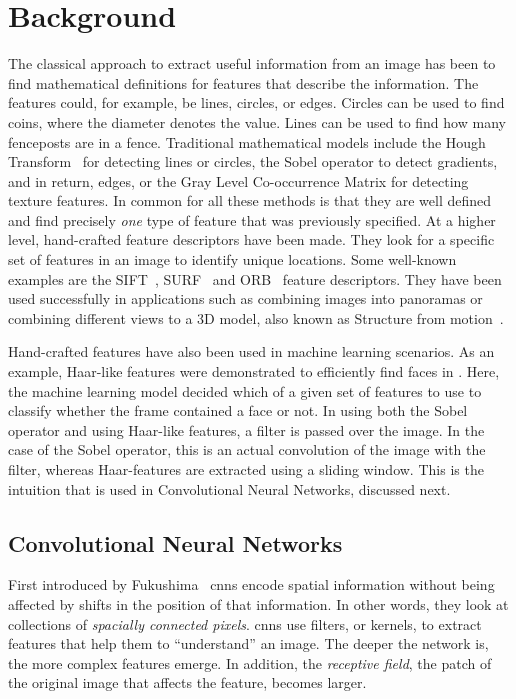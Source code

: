 \chapter{Background}

The classical approach to extract useful information from an image has been to find mathematical definitions for features that describe the information. The features could, for example, be lines, circles, or edges. 
Circles can be used to find coins, where the diameter denotes the value. Lines can be used to find how many fenceposts are in a fence. Traditional mathematical models include the Hough Transform~\cite{houghTransform} for detecting lines or circles, the Sobel operator to detect gradients, and in return, edges, or the Gray Level Co-occurrence Matrix for detecting texture features. 
In common for all these methods is that they are well defined and find precisely \emph{one} type of feature that was previously specified. 
At a higher level, hand-crafted feature descriptors have been made. They look for a specific set of features in an image to identify unique locations. Some well-known examples are the SIFT~\cite{sift1999Lowe}, SURF~\cite{surf2006Bay} and ORB~\cite{orb2011Rublee} feature descriptors. They have been used successfully in applications such as combining images into panoramas or combining different views to a 3D model, also known as Structure from motion~\cite{sfm1979ullman}.

Hand-crafted features have also been used in machine learning scenarios. As an example, Haar-like features were demonstrated to efficiently find faces in \cite{haarcascade}. Here, the machine learning model decided which of a given set of features to use to classify whether the frame contained a face or not. In using both the Sobel operator and using Haar-like features, a filter is passed over the image. In the case of the Sobel operator, this is an actual convolution of the image with the filter, whereas Haar-features are extracted using a sliding window. This is the intuition that is used in Convolutional Neural Networks, discussed next.

\section{Convolutional Neural Networks}\label{sec:background_cnn}
First introduced by Fukushima~\cite{Fukushima1980} \gls{cnn}s encode spatial information without being affected by shifts in the position of that information. In other words, they look at collections of \emph{spacially connected pixels}. \gls{cnn}s use filters, or kernels, to extract features that help them to ``understand'' an image. The deeper the network is, the more complex features emerge. In addition, the \emph{receptive field}, the patch of the original image that affects the feature, becomes larger. 

